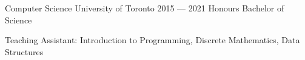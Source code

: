 
\begin{cventries}
  \cventry
    {Computer Science}
    {University of Toronto}
    {}
    {2015 --- 2021}
    {Honours Bachelor of Science}
    {
      \begin{cvitems}
        \item {Teaching Assistant: Introduction to Programming, Discrete Mathematics, Data Structures}
      \end{cvitems}
    }
\end{cventries}
